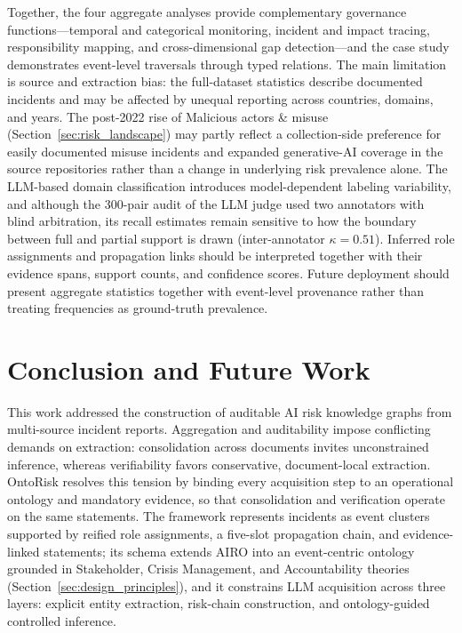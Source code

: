 \documentclass[a4paper,fleqn]{cas-dc}
\begin{document}
Together, the four aggregate analyses provide complementary governance
functions---temporal and categorical monitoring, incident and impact
tracing, responsibility mapping, and cross-dimensional gap
detection---and the case study demonstrates event-level traversals
through typed relations.
The main limitation is source and extraction bias: the full-dataset
statistics describe documented incidents and may be affected by
unequal reporting across countries, domains, and years.
The post-2022 rise of Malicious actors \& misuse
(Section~\ref{sec:risk_landscape}) may partly reflect a collection-side
preference for easily documented misuse incidents and expanded
generative-AI coverage in the source repositories rather than a change
in underlying risk prevalence alone.
The LLM-based domain classification introduces model-dependent
labeling variability, and although the 300-pair audit of the LLM judge
used two annotators with blind arbitration, its recall estimates
remain sensitive to how the boundary between full and partial support
is drawn (inter-annotator $\kappa = 0.51$).
Inferred role assignments and propagation
links should be interpreted together with their evidence spans,
support counts, and confidence scores.
Future deployment should present aggregate statistics together with
event-level provenance rather than treating frequencies as
ground-truth prevalence.

\section{Conclusion and Future Work}

This work addressed the construction of auditable AI risk knowledge
graphs from multi-source incident reports. Aggregation and
auditability impose conflicting demands on extraction: consolidation
across documents invites unconstrained inference, whereas
verifiability favors conservative, document-local extraction.
OntoRisk resolves this tension by binding every acquisition step to an
operational ontology and mandatory evidence, so that consolidation and
verification operate on the same statements.
The framework represents incidents as event clusters supported by
reified role assignments, a five-slot propagation chain, and
evidence-linked statements; its schema extends AIRO into an
event-centric ontology grounded in Stakeholder, Crisis Management, and
Accountability theories (Section~\ref{sec:design_principles}), and it
constrains LLM acquisition across three layers: explicit entity
extraction, risk-chain construction, and ontology-guided controlled
inference.
\end{document}
